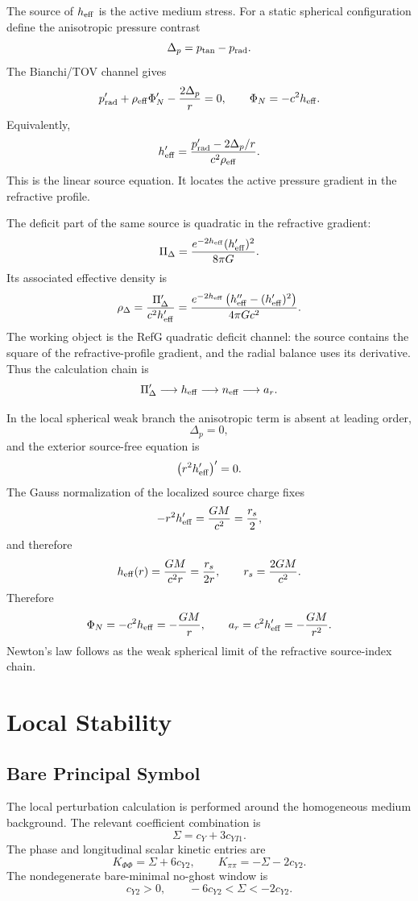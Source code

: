 \documentclass[12pt,a4paper]{article}
\begin{document}
The source of $h_{\rm eff}$ is the active medium stress. For a static spherical configuration define the anisotropic pressure contrast
\[
\Delta_p=p_{\rm tan}-p_{\rm rad}.
\]
The Bianchi/TOV channel gives
\[
p_{\rm rad}'+\rho_{\rm eff}\Phi_N'
-\frac{2\Delta_p}{r}=0,
\qquad
\Phi_N=-c^2h_{\rm eff}.
\]
Equivalently,
\[
h_{\rm eff}'=
\frac{p_{\rm rad}'-2\Delta_p/r}{c^2\rho_{\rm eff}}.
\]
This is the linear source equation. It locates the active pressure gradient in the refractive profile.

The deficit part of the same source is quadratic in the refractive gradient:
\[
\Pi_\Delta=\frac{e^{-2h_{\rm eff}}(h_{\rm eff}')^2}{8\pi G}.
\]
Its associated effective density is
\[
\rho_\Delta=\frac{\Pi_\Delta'}{c^2h_{\rm eff}'}
=\frac{e^{-2h_{\rm eff}}\left(h_{\rm eff}''-(h_{\rm eff}')^2\right)}
{4\pi G c^2}.
\]
The working object is the RefG quadratic deficit channel:
the source contains the square of the refractive-profile gradient, and the
radial balance uses its derivative.
Thus the calculation chain is
\[
\Pi_\Delta' \longrightarrow h_{\rm eff} \longrightarrow n_{\rm eff}
\longrightarrow a_r.
\]

In the local spherical weak branch the anisotropic term is absent at leading order,
\[
\Delta_p=0,
\]
and the exterior source-free equation is
\[
\left(r^2h_{\rm eff}'\right)'=0.
\]
The Gauss normalization of the localized source charge fixes
\[
-r^2h_{\rm eff}'=\frac{GM}{c^2}=\frac{r_s}{2},
\]
and therefore
\[
h_{\rm eff}(r)=\frac{GM}{c^2r}=\frac{r_s}{2r},
\qquad r_s=\frac{2GM}{c^2}.
\]
Therefore
\[
\Phi_N=-c^2h_{\rm eff}=-\frac{GM}{r},
\qquad
a_r=c^2h_{\rm eff}'=-\frac{GM}{r^2}.
\]
Newton's law follows as the weak spherical limit of the refractive source-index chain.

\section{Local Stability}

\subsection{Bare Principal Symbol}

The local perturbation calculation is performed around the homogeneous medium background. The relevant coefficient combination is
\[
\Sigma=c_Y+3c_{YI1}.
\]
The phase and longitudinal scalar kinetic entries are
\[
K_{\Phi\Phi}=\Sigma+6c_{Y2},
\qquad
K_{\pi\pi}=-\Sigma-2c_{Y2}.
\]
The nondegenerate bare-minimal no-ghost window is
\[
c_{Y2}>0,\qquad
-6c_{Y2}<\Sigma<-2c_{Y2}.
\]
\end{document}
